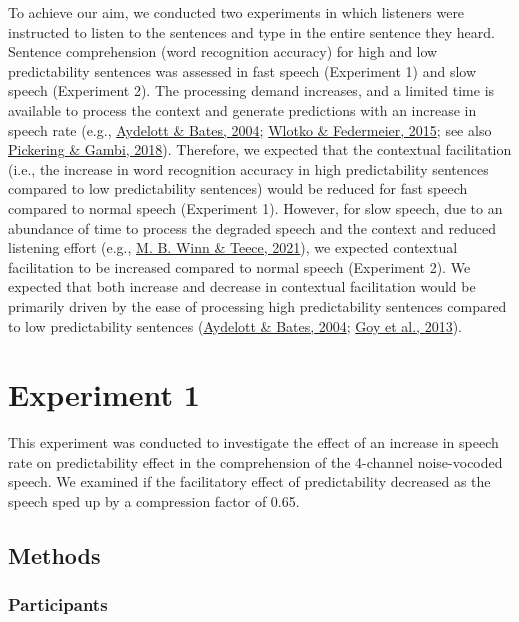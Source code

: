 \documentclass[a4paper, nobind]{templates/ociamthesis}
\begin{document}
To achieve our aim, we conducted two experiments in which listeners were instructed to listen to the sentences and type in the entire sentence they heard.
Sentence comprehension (word recognition accuracy) for high and low predictability sentences was assessed in fast speech (Experiment 1) and slow speech (Experiment 2).
The processing demand increases, and a limited time is available to process the context and generate predictions with an increase in speech rate (e.g., \protect\hyperlink{ref-Aydelott2004}{Aydelott \& Bates, 2004}; \protect\hyperlink{ref-Wlotko2015}{Wlotko \& Federmeier, 2015}; see also \protect\hyperlink{ref-Pickering2018}{Pickering \& Gambi, 2018}).
Therefore, we expected that the contextual facilitation (i.e., the increase in word recognition accuracy in high predictability sentences compared to low predictability sentences) would be reduced for fast speech compared to normal speech (Experiment 1).
However, for slow speech, due to an abundance of time to process the degraded speech and the context and reduced listening effort (e.g., \protect\hyperlink{ref-Winn2021}{M. B. Winn \& Teece, 2021}), we expected contextual facilitation to be increased compared to normal speech (Experiment 2).
We expected that both increase and decrease in contextual facilitation would be primarily driven by the ease of processing high predictability sentences compared to low predictability sentences (\protect\hyperlink{ref-Aydelott2004}{Aydelott \& Bates, 2004}; \protect\hyperlink{ref-Goy2013}{Goy et al., 2013}).

\hypertarget{experiment-1}{%
\section{Experiment 1}\label{experiment-1}}

This experiment was conducted to investigate the effect of an increase in speech rate on predictability effect in the comprehension of the 4-channel noise-vocoded speech.
We examined if the facilitatory effect of predictability decreased as the speech sped up by a compression factor of 0.65.

\hypertarget{methods-3}{%
\subsection{Methods}\label{methods-3}}

\hypertarget{participants-2}{%
\subsubsection{Participants}\label{participants-2}}
\end{document}
